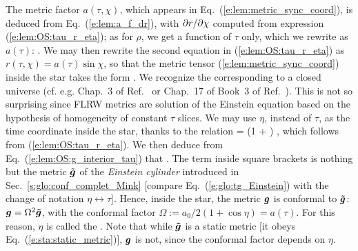 The metric factor $a(\tau,\chi)$, which appears in Eq.~(\ref{e:lem:metric_sync_coord}),
is deduced from Eq.~(\ref{e:lem:a_f_dr}), with ${\partial r}/{\partial \chi}$ computed
from expression (\ref{e:lem:OS:tau_r_eta}); as for $\rho$, we get a function of $\tau$
only, which we rewrite as $a(\tau)$:
\be \label{e:lem:OS:a_tau}
   .
\ee
We may then rewrite the second equation in (\ref{e:lem:OS:tau_r_eta}) as
$r(\tau,\chi) = a(\tau) \sin\chi$, so that the metric
tensor (\ref{e:lem:metric_sync_coord}) inside the star takes the form
\be \label{e:lem:OS:g_interior_tau}
   .
\ee
We recognize the  corresponding to a closed universe
(cf. e.g. Chap.~3 of Ref.~\cite{PeterU09} or Chap.~17 of Book~3 of Ref.~\cite{DerueU18}).
This is not so surprising since FLRW metrics are solution of the Einstein equation based on the hypothesis of homogeneity of constant $\tau$ slices.
We may use $\eta$, instead of $\tau$, as the time coordinate inside the star, thanks to the
relation
\be
    \dd\tau =  (1 + \cos\eta) \dd\eta ,
\ee
which follows from (\ref{e:lem:OS:tau_r_eta}). We then deduce from Eq.~(\ref{e:lem:OS:g_interior_tau})
that
\be \label{e:lem:OS:g_int}
     .
\ee
The term inside square brackets is nothing but the metric $\tilde{\bm{g}}$ of the
\emph{Einstein cylinder} introduced in Sec.~\ref{s:glo:conf_complet_Mink}
[compare Eq.~(\ref{e:glo:tg_Einstein}) with the change of notation $\eta \leftrightarrow \tau$].
Hence, inside the star, the metric $\bm{g}$ is conformal to $\bm{\tilde{g}}$:
$\bm{g} = \Omega^2 \bm{\tilde{g}}$,
with the conformal factor $\Omega := a_0/2 (1 + \cos\eta) = a(\tau)$.
For this reason, $\eta$ is called the .
Note that while $\bm{\tilde{g}}$
is a static metric [it obeys Eq.~(\ref{e:sta:static_metric})], $\bm{g}$ is not, since
the conformal factor depends on $\eta$.

